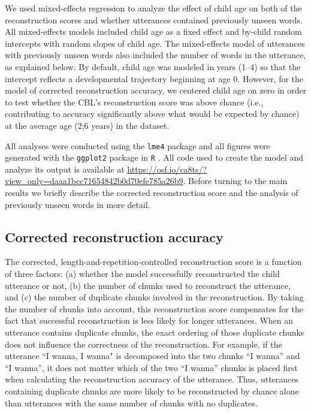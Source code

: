 \documentclass{article}
\begin{document}
We used mixed-effects regression to analyze the effect of child age on both of the reconstruction scores and whether utterances contained previously unseen words. All mixed-effects models included child age as a fixed effect and by-child random intercepts with random slopes of child age. The mixed-effects model of utterances with previously unseen words also included the number of words in the utterance, as explained below. By default, child age was modeled in years (1--4) so that the intercept reflects a developmental trajectory beginning at age 0. However, for the model of corrected reconstruction accuracy, we centered child age on zero in order to test whether the CBL's reconstruction score was above chance (i.e., contributing to accuracy significantly above what would be expected by chance) at the average age (2;6 years) in the dataset.

All analyses were conducted using the \texttt{lme4} package \cite{lme4} and all figures were generated with the \texttt{ggplot2} package in \texttt{R} \cite{ggplot2, R}. All code used to create the model and analyze its output is available at \url{https://osf.io/ca8ts/?view_only=daaa1bcc71654842b0d70efe785a26b9}. Before turning to the main results we briefly describe the corrected reconstruction score and the analysis of previously unseen words in more detail.  


\subsection{Corrected reconstruction accuracy}
The corrected, length-and-repetition-controlled reconstruction score is a function of three factors: (a) whether the model successfully reconstructed the child utterance or not, (b) the number of chunks used to reconstruct the utterance, and (c) the number of duplicate chunks involved in the reconstruction. By taking the number of chunks into account, this reconstruction score compensates for the fact that successful reconstruction is less likely for longer utterances. When an utterance contains duplicate chunks, the exact ordering of those duplicate chunks does not influence the correctness of the reconstruction. For example, if the utterance ``I wanna, I wanna" is decomposed into the two chunks ``I wanna'' and ``I wanna'', it does not matter which of the two ``I wanna'' chunks is placed first when calculating the reconstruction accuracy of the utterance. Thus, utterances containing duplicate chunks are more likely to be reconstructed by chance alone than utterances with the same number of chunks with no duplicates.
\end{document}
